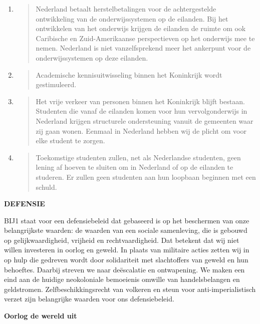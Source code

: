 \begin{enumerate}
\def\labelenumi{\arabic{enumi}.}
\item
  \begin{quote}
  Nederland betaalt herstelbetalingen voor de achtergestelde
  ontwikkeling van de onderwijssystemen op de eilanden. Bij het
  ontwikkelen van het onderwijs krijgen de eilanden de ruimte om ook
  Caribische en Zuid-Amerikaanse perspectieven op het onderwijs mee te
  nemen. Nederland is niet vanzelfsprekend meer het ankerpunt voor de
  onderwijssystemen op deze eilanden.
  \end{quote}
\item
  \begin{quote}
  Academische kennisuitwisseling binnen het Koninkrijk wordt
  gestimuleerd.
  \end{quote}
\item
  \begin{quote}
  Het vrije verkeer van personen binnen het Koninkrijk blijft bestaan.
  Studenten die vanaf de eilanden komen voor hun vervolgonderwijs in
  Nederland krijgen structurele ondersteuning vanuit de gemeenten waar
  zij gaan wonen. Eenmaal in Nederland hebben wij de plicht om voor elke
  student te zorgen.
  \end{quote}
\item
  \begin{quote}
  Toekomstige studenten zullen, net als Nederlandse studenten, geen
  lening af hoeven te sluiten om in Nederland of op de eilanden te
  studeren. Er zullen geen studenten aan hun loopbaan beginnen met een
  schuld.
  \end{quote}
\end{enumerate}

\textbf{DEFENSIE}

BIJ1 staat voor een defensiebeleid dat gebaseerd is op het beschermen
van onze belangrijkste waarden: de waarden van een sociale samenleving,
die is gebouwd op gelijkwaardigheid, vrijheid en rechtvaardigheid. Dat
betekent dat wij niet willen investeren in oorlog en geweld. In plaats
van militaire acties zetten wij in op hulp die gedreven wordt door
solidariteit met slachtoffers van geweld en hun behoeftes. Daarbij
streven we naar deëscalatie en ontwapening. We maken een eind aan de
huidige neokoloniale bemoeienis omwille van handelsbelangen en
geldstromen. Zelfbeschikkingsrecht van volkeren en steun voor
anti-imperialistisch verzet zijn belangrijke waarden voor ons
defensiebeleid.

\textbf{Oorlog de wereld uit}

